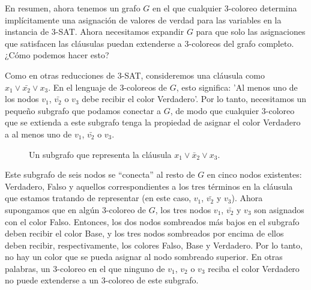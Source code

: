 \documentclass[12pt]{article}
\begin{document}
En resumen, ahora tenemos un grafo \( G \) en el que cualquier 3-coloreo determina implícitamente una asignación de valores de verdad para las variables en la instancia de 3-SAT. Ahora necesitamos expandir \( G \) para que solo las asignaciones que satisfacen las cláusulas puedan extenderse a 3-coloreos del grafo completo. ¿Cómo podemos hacer esto?

Como en otras reducciones de 3-SAT, consideremos una cláusula como \( x_1 \lor \bar{x_2} \lor x_3 \). En el lenguaje de 3-coloreos de \( G \), esto significa: 'Al menos uno de los nodos \( v_1 \), \( \bar{v_2} \) o \( v_3 \) debe recibir el color Verdadero'. Por lo tanto, necesitamos un pequeño subgrafo que podamos conectar a \( G \), de modo que cualquier 3-coloreo que se extienda a este subgrafo tenga la propiedad de asignar el color Verdadero a al menos uno de \( v_1 \), \( \bar{v_2} \) o \( v_3 \).


\begin{figure}[h!]
    \centering
    \caption{Un subgrafo que representa la cláusula $x_1 \lor \bar{x}_2 \lor x_3$.}
    \label{fig:example2}
\end{figure}

Este subgrafo de seis nodos se “conecta” al resto de \( G \) en cinco nodos existentes: Verdadero, Falso y aquellos correspondientes a los tres términos en la cláusula que estamos tratando de representar (en este caso, \( v_1 \), \( \bar{v_2} \) y \( v_3 \)). Ahora supongamos que en algún 3-coloreo de \( G \), los tres nodos \( v_1 \), \( \bar{v_2} \) y \( v_3 \) son asignados con el color Falso. Entonces, los dos nodos sombreados más bajos en el subgrafo deben recibir el color Base, y los tres nodos sombreados por encima de ellos deben recibir, respectivamente, los colores Falso, Base y Verdadero. Por lo tanto, no hay un color que se pueda asignar al nodo sombreado superior. En otras palabras, un 3-coloreo en el que ninguno de \( v_1 \), \( v_2 \) o \( v_3 \) reciba el color Verdadero no puede extenderse a un 3-coloreo de este subgrafo.
\end{document}
